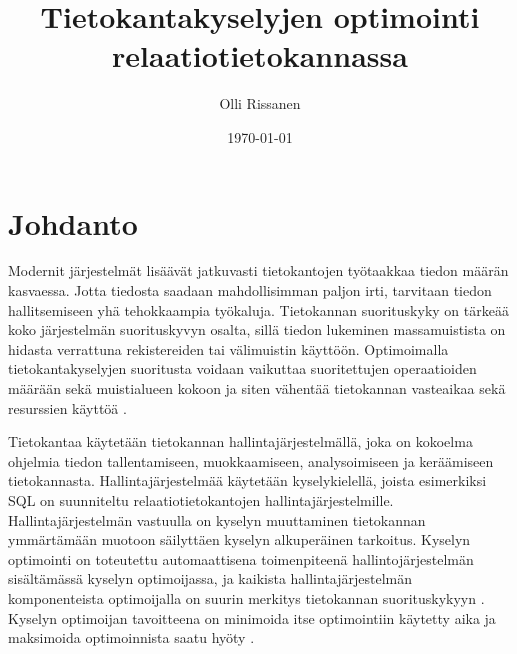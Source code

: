 \documentclass[finnish]{tktltiki2}
\title{Tietokantakyselyjen optimointi relaatiotietokannassa}
\author{Olli Rissanen}
\date{\today}
\theoremstyle{definition}
\theoremstyle{remark}
\begin{document}

\maketitle
\makeabstract
\tableofcontents
\newpage


\section{Johdanto}
Modernit järjestelmät lisäävät jatkuvasti tietokantojen työtaakkaa tiedon määrän kasvaessa. Jotta tiedosta saadaan mahdollisimman paljon irti, tarvitaan tiedon hallitsemiseen yhä tehokkaampia työkaluja. %
Tietokannan suorituskyky on tärkeää koko järjestelmän suorituskyvyn osalta, sillä tiedon lukeminen massamuistista on hidasta verrattuna rekistereiden tai välimuistin käyttöön. Optimoimalla tietokantakyselyjen suoritusta voidaan vaikuttaa suoritettujen operaatioiden määrään sekä muistialueen kokoon ja siten vähentää tietokannan vasteaikaa sekä resurssien käyttöä \cite{mor2012}. 
	
% 

Tietokantaa käytetään tietokannan hallintajärjestelmällä, joka on kokoelma ohjelmia tiedon tallentamiseen, muokkaamiseen, analysoimiseen ja keräämiseen tietokannasta. Hallintajärjestelmää käytetään kyselykielellä, joista esimerkiksi SQL \cite{5391051} on suunniteltu relaatiotietokantojen hallintajärjestelmille. Hallintajärjestelmän vastuulla on kyselyn muuttaminen tietokannan ymmärtämään muotoon säilyttäen kyselyn alkuperäinen tarkoitus. Kyselyn optimointi on toteutettu automaattisena toimenpiteenä hallintojärjestelmän sisältämässä kyselyn optimoijassa, ja kaikista hallintajärjestelmän komponenteista optimoijalla on suurin merkitys tietokannan suorituskykyyn \cite{mor2012}. Kyselyn optimoijan tavoitteena on minimoida itse optimointiin käytetty aika ja maksimoida optimoinnista saatu hyöty \cite{jarke1984}. 
\end{document}
